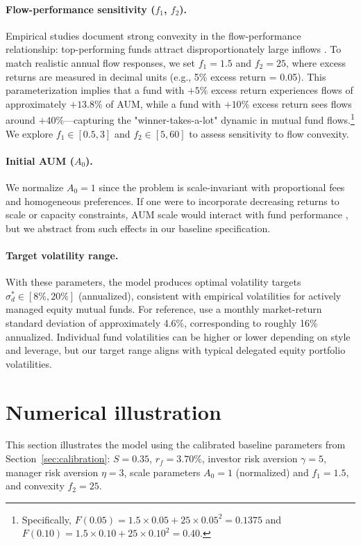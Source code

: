\documentclass[11pt]{article}
\newcommand{\Sharpe}{S}
\begin{document}
\paragraph{Flow-performance sensitivity (\(f_1\), \(f_2\)).}
Empirical studies document strong convexity in the flow-performance relationship: top-performing funds attract disproportionately large inflows \citep[][]{sirri1998costly, ferreira2012flow}. To match realistic annual flow responses, we set \(f_1=1.5\) and \(f_2=25\), where excess returns are measured in decimal units (e.g., 5\% excess return = 0.05). This parameterization implies that a fund with \(+5\%\) excess return experiences flows of approximately \(+13.8\%\) of AUM, while a fund with \(+10\%\) excess return sees flows around \(+40\%\)—capturing the "winner-takes-a-lot" dynamic in mutual fund flows.\footnote{Specifically, \(F(0.05) = 1.5 \times 0.05 + 25 \times 0.05^2 = 0.1375\) and \(F(0.10) = 1.5 \times 0.10 + 25 \times 0.10^2 = 0.40\).} We explore \(f_1\in[0.5,3]\) and \(f_2\in[5,60]\) to assess sensitivity to flow convexity.

\paragraph{Initial AUM (\(A_0\)).}
We normalize \(A_0=1\) since the problem is scale-invariant with proportional fees and homogeneous preferences. If one were to incorporate decreasing returns to scale or capacity constraints, AUM scale would interact with fund performance \citep[][]{berk2004mutual}, but we abstract from such effects in our baseline specification.

\paragraph{Target volatility range.}
With these parameters, the model produces optimal volatility targets \(\sigma_d^*\in[8\%,20\%]\) (annualized), consistent with empirical volatilities for actively managed equity mutual funds. For reference, \citet[][]{barras2010false} use a monthly market-return standard deviation of approximately 4.6\%, corresponding to roughly 16\% annualized. Individual fund volatilities can be higher or lower depending on style and leverage, but our target range aligns with typical delegated equity portfolio volatilities.


\section{Numerical illustration}
\label{sec:numerical}
This section illustrates the model using the calibrated baseline parameters from Section~\ref{sec:calibration}: \(\Sharpe=0.35\), \(r_f=3.70\%\), investor risk aversion \(\gamma=5\), manager risk aversion \(\eta=3\), scale parameters \(A_0=1\) (normalized) and \(f_1=1.5\), and convexity \(f_2=25\).
\end{document}
